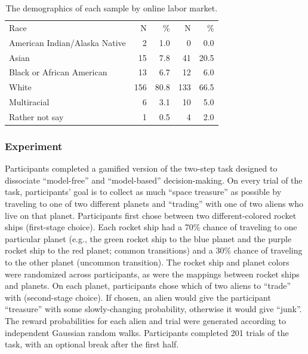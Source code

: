 \documentclass[a4paper,notitlepage,12pt]{article}
\begin{document}
\begin{table}[!h]
\begin{tabular}{lrrrr}
        \midrule
        Race & N & \% & N & \% \\
        \cmidrule(lr){1-5}
        American Indian/Alaska Native &     2 &   1.0 &      0 &   0.0 \\
        Asian                         &    15 &   7.8 &     41 &  20.5 \\
        Black or African American     &    13 &   6.7 &     12 &   6.0 \\
        White                         &   156 &  80.8 &    133 &  66.5 \\
        Multiracial                   &     6 &   3.1 &     10 &   5.0 \\
        Rather not say                &     1 &   0.5 &      4 &   2.0 \\
        \bottomrule
    \end{tabular}
    \caption{The demographics of each sample by online labor market.}
    \label{tab:S10}
\end{table}

\subsubsection*{Experiment}

Participants completed a gamified version of the two-step task \cite{daw2011model} designed to dissociate ``model-free'' and ``model-based'' decision-making. On every trial of the task, participants' goal is to collect as much ``space treasure'' as possible by traveling to one of two different planets and ``trading'' with one of two aliens who live on that planet. Participants first chose between two different-colored rocket ships (first-stage choice). Each rocket ship had a 70\% chance of traveling to one particular planet (e.g., the green rocket ship to the blue planet and the purple rocket ship to the red planet; common transitions) and a 30\% chance of traveling to the other planet (uncommon transition). The rocket ship and planet colors were randomized across participants, as were the mappings between rocket ships and planets. On each planet, participants chose which of two aliens to ``trade'' with (second-stage choice). If chosen, an alien would give the participant ``treasure'' with some slowly-changing probability, otherwise it would give ``junk''. The reward probabilities for each alien and trial were generated according to independent Gaussian random walks. Participants completed 201 trials of the task, with an optional break after the first half. 
\end{document}
